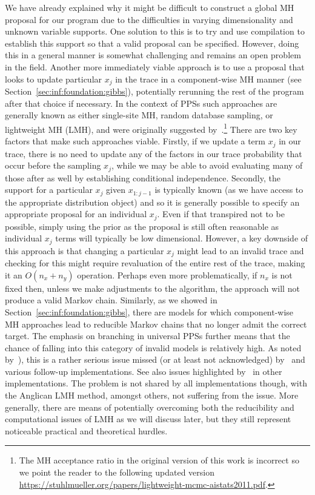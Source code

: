 We have already explained why it might be difficult to construct a global MH proposal for
our program due to the difficulties in varying dimensionality and unknown variable supports.
One solution to this is to try and use compilation to establish this support so that
a valid proposal can be specified.  However, doing this in a general manner is somewhat
challenging and remains an open problem in the field.  Another more immediately viable
approach is to use a proposal that looks to update particular $x_j$ in the trace in a
component-wise MH manner (see Section~\ref{sec:inf:foundation:gibbs}), potentially rerunning
the rest of the program after that choice if necessary.  In the context of PPSs such
approaches are generally known as either single-site MH, random database sampling, or lightweight MH (LMH), and were
originally suggested by~\citep{wingate2011lightweight}.\footnote{The MH acceptance ratio in the original version of this work
	is incorrect so we point the reader to the following updated version
	\url{https://stuhlmueller.org/papers/lightweight-mcmc-aistats2011.pdf}.} There are two key factors
that make such approaches viable.  Firstly, if we update a term $x_j$ in our trace, there is
no need to update any of the factors in our trace probability that occur before the sampling
$x_j$, while we may be able to avoid evaluating many of those after as well by establishing
conditional independence.  Secondly, the support for a particular $x_j$ given
$x_{1:j-1}$ is typically known (as 
we have access to the appropriate distribution object) and so it is generally possible to specify
an appropriate proposal for an individual $x_j$.  Even if that transpired not to be possible, 
simply using the prior as the proposal is still often reasonable as individual $x_j$ terms will typically
be low dimensional.  However, a key downside of this approach is that changing a particular $x_j$
might lead to an invalid trace and checking for this might require revaluation of the entire rest of the
trace, making it an $O(n_x+n_y)$ operation.  Perhaps even more problematically, if $n_x$ is not fixed
then, unless we make adjustments to the algorithm, the approach will not produce a 
valid Markov chain.  Similarly, as we showed in Section~\ref{sec:inf:foundation:gibbs},
there are models for which component-wise MH approaches lead to reducible Markov chains
that no longer admit the correct target.  The emphasis on branching in universal PPSs further
means that the chance of falling into this category of invalid models is relatively high.  As
noted by~\citep{kiselyov2016problems}), this is a rather serious issue missed (or at least not
acknowledged) by~\cite{wingate2011lightweight} and various follow-up implementations.
See also issues highlighted by~\citep{hur2015provably} in other implementations.
The problem is not shared by all implementations though, with the Anglican LMH method, amongst
others, not suffering from the issue.
More generally, there are means of potentially overcoming both the reducibility and computational
issues of LMH as we will discuss later, but
they still represent noticeable practical and theoretical hurdles.

